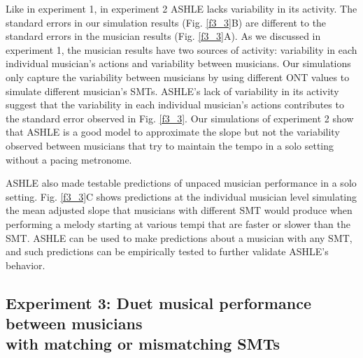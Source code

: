 \documentclass{report}
\begin{document}
Like in experiment 1, in experiment 2 ASHLE lacks variability in its activity. The standard errors in our simulation results (Fig.{} \ref{f3_3}B) are different to the standard errors in the musician results (Fig.{} \ref{f3_3}A). As we discussed in experiment 1, the musician results have two sources of activity: variability in each individual musician's actions and variability between musicians. Our simulations only capture the variability between musicians by using different ONT values to simulate different musician's SMTs. ASHLE's lack of variability in its activity suggest that the variability in each individual musician's actions contributes to the standard error observed in Fig.{} \ref{f3_3}. Our simulations of experiment 2 show that ASHLE is a good model to approximate the slope but not the variability observed between musicians that try to maintain the tempo in a solo setting without a pacing metronome.

ASHLE also made testable predictions of unpaced musician performance in a solo setting. Fig.{} \ref{f3_3}C shows predictions at the individual musician level simulating the mean adjusted slope that musicians with different SMT would produce when performing a melody starting at various tempi that are faster or slower than the SMT. ASHLE can be used to make predictions about a musician with any SMT, and such predictions can be empirically tested to further validate ASHLE's behavior.

\subsection{Experiment 3: Duet musical performance between musicians \\ with matching or mismatching SMTs}
\end{document}
